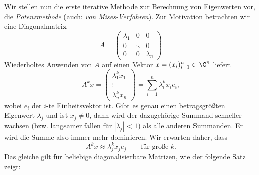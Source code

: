 \documentclass[
]{mycourse}
\theoremstyle{mythm}
\theoremstyle{break}
\begin{document}
Wir stellen nun die erste iterative Methode zur Berechnung von Eigenwerten vor, die \emph{Potenzmethode} (auch: \emph{von Mises-Verfahren}).
 Zur Motivation betrachten wir eine
Diagonalmatrix 
\[
A=\begin{pmatrix} \lambda_1 & 0 & 0\\ 0 & \ddots & 0\\ 0 & 0 & \lambda_n\end{pmatrix}
\]
Wiederholtes Anwenden von $A$ auf einen Vektor $x=(x_i)_{i=1}^n\in \C^n$ liefert
\[
A^k x=\begin{pmatrix} \lambda_1^k x_1\\ \vdots \\ \lambda_n^k x_n\end{pmatrix} = \sum_{i=1}^n \lambda_i^k x_i e_i,
\]
wobei $e_i$ der $i$-te Einheitsvektor ist. 
Gibt es genau einen betragsgrößten Eigenwert $\lambda_j$ und ist $x_j\neq 0$, dann wird der 
dazugehörige Summand schneller wachsen (bzw. langsamer fallen für $|\lambda_j|<1$) als alle anderen Summanden. 
Er wird die Summe also immer mehr dominieren. Wir erwarten daher, dass
\[
A^k x\approx \lambda_j^k x_j e_j
\qquad \text{für große $k$.}
\]
Das gleiche gilt für beliebige diagonalisierbare Matrizen, wie der folgende Satz zeigt:
\end{document}
